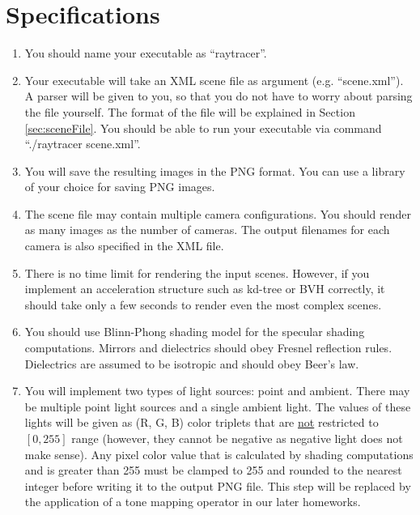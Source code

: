 \documentclass[12pt]{article}
\begin{document}
\section{Specifications}
\begin{enumerate}

\item \textbf{}You should name your executable as ``raytracer''.

\item \textbf{}Your executable will take an XML scene file as argument
(e.g. ``scene.xml''). A parser will be given to you, so that you do not
have to worry about parsing the file yourself. The format of the file
will be explained in Section \ref{sec:sceneFile}. You should be able to
run your executable via command  ``./raytracer scene.xml''.

\item \textbf{}You will save the resulting images in the PNG format. You
can use a library of your choice for saving PNG images.

\item \textbf{}The scene file may contain multiple camera
configurations. You should render as many images as the number of
cameras. The output filenames for each camera is also specified in the
XML file.

\item \textbf{}There is no time limit for rendering the input scenes.
However, if you implement an acceleration structure such as kd-tree or
BVH correctly, it should take only a few seconds to render even the most
complex scenes.

\item \textbf{}You should use Blinn-Phong shading model for the specular
shading computations.  Mirrors and dielectrics should obey Fresnel
reflection rules.  Dielectrics are assumed to be isotropic and should
obey Beer's law.

\item \textbf{}You will implement two types of light sources: point and
ambient. There may be multiple point light sources and a single ambient
light. The values of these lights will be given as (R, G, B) color
triplets that are \underline{not} restricted to $[0, 255]$ range (however,
        they cannot be negative as negative light does not make sense).
Any pixel color value that is calculated by shading computations and is
greater than 255 must be clamped to 255 and rounded to the nearest
integer before writing it to the output PNG file. This step will be
replaced by the application of a tone mapping operator in our later
homeworks.


\end{enumerate}
\end{document}
